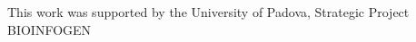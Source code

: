 \begin{acks}
This work was supported by the University of Padova, Strategic Project BIOINFOGEN

\end{acks}

%
%
%
%

